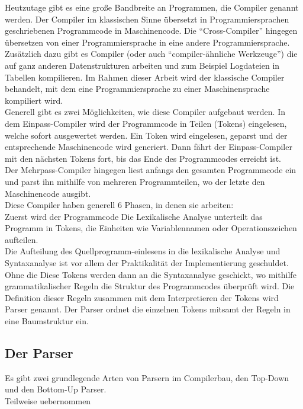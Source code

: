Heutzutage gibt es eine große Bandbreite an Programmen, die Compiler genannt werden.
Der Compiler im klassischen Sinne übersetzt in Programmiersprachen geschriebenen Programmcode in Maschinencode.
Die ``Cross-Compiler'' hingegen übersetzen von einer Programmiersprache in eine andere Programmiersprache.
Zusätzlich dazu gibt es Compiler (oder auch ``compiler-ähnliche Werkzeuge'') die auf ganz anderen Datenstrukturen arbeiten und zum Beispiel Logdateien in Tabellen kompilieren.
Im Rahmen dieser Arbeit wird der klassische Compiler behandelt, mit dem eine Programmiersprache zu einer Maschinensprache kompiliert wird.\\
Generell gibt es zwei Möglichkeiten, wie diese Compiler aufgebaut werden.
In dem Einpass-Compiler wird der Programmcode in Teilen (Tokens) eingelesen, welche sofort ausgewertet werden.
Ein Token wird eingelesen, geparst und der entsprechende Maschinencode wird generiert.
Dann fährt der Einpass-Compiler mit den nächsten Tokens fort, bis das Ende des Programmcodes erreicht ist.\\
Der Mehrpass-Compiler hingegen liest anfangs den gesamten Programmcode ein und parst ihn mithilfe von mehreren Programmteilen, wo der letzte den Maschinencode ausgibt\cite{mossenbock:2024}.\\
Diese Compiler haben generell 6 Phasen, in denen sie arbeiten:\\
Zuerst wird der Programmcode 
Die Lexikalische Analyse unterteilt das Programm in Tokens, die Einheiten wie Variablennamen oder Operationszeichen aufteilen.\\
Die Aufteilung des Quellprogramm-einlesens in die lexikalische Analyse und Syntaxanalyse ist vor allem der Praktikalität der Implementierung geschuldet.
Ohne die 
Diese Tokens werden dann an die Syntaxanalyse geschickt, wo mithilfe grammatikalischer Regeln die Struktur des Programmcodes überprüft wird.
Die Definition dieser Regeln zusammen mit dem Interpretieren der Tokens wird Parser genannt.
Der Parser ordnet die einzelnen Tokens mitsamt der Regeln in eine Baumstruktur ein.

\subsection{Der Parser}

Es gibt zwei grundlegende Arten von Parsern im Compilerbau, den Top-Down und den Bottom-Up Parser.\\

\textsf{Teilweise uebernommen}\\

